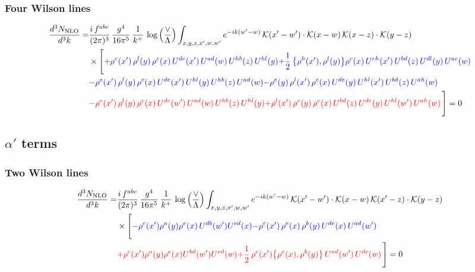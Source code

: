 \documentclass[9pt]{article}
\numberwithin{equation}{section}
\begin{document}
\subsubsection{Four Wilson lines}
\begin{align}
\frac{d^{3}N_{\rm NLO}}{d^{3}k} = &\frac{i\,f^{abc}}{(2\pi)^{3}}\,\frac{g^{4}}{16\pi^{5}}\,\frac{1}{k^{+}}\,\log\Big(\frac{\vee}{\Lambda}\Big)\int_{x,y,z,x',w,w'}e^{-ik(w'-w)}\,\mathcal{K}(x'-w')\cdot\mathcal{K}(x-w)\,\mathcal{K}(x-z)\cdot\mathcal{K}(y-z)\notag\\
&\times\Bigg[{\color{blue}+\rho^{e}(x')\, \rho^{l}(y)\,\rho^{c}(x)\, U^{de}(x')\,U^{ad}(w)\,U^{hb}(z)\,U^{hl}(y)}{\color{blue}+\frac{1}{2}\,\big\{\rho^{h}(x'),\rho^{l}(y)\big\}\rho^{c}(x)\,U^{eh}(x')\,U^{bd}(z)\,U^{dl}(y)\,U^{ae}(w)}\notag \\
&{\color{blue}-\rho^{e}(x')\,\rho^{l}(y)\,\rho^{c}(x)\,U^{de}(x')\,U^{hl}(y)\,U^{hb}(z)\,U^{ad}(w)}{\color{blue}-\rho^{e}(y)\,\rho^{l}(x')\,\rho^{c}(x)\,U^{de}(y)\,U^{hl}(x')\,U^{bd}(z)\,U^{ah}(w)} \notag \\ &{\color{red}-\rho^{e}(x')\, \rho^{l}(y)\,\rho^{c}(x)\, U^{de}(w')\,U^{ad}(w)\,U^{hb}(z)\,U^{hl}(y)}{\color{red}+\rho^{l}(x')\,\rho^{e}(y)\,\rho^{c}(x)\,U^{bd}(z)\,U^{de}(y)\,U^{hl}(w')\,U^{ah}(w)}\,\Bigg] = 0
\end{align}
\subsection{$\alpha'$ terms}
\subsubsection{Two Wilson lines}
\begin{align}
\frac{d^{3}N_{\rm NLO}}{d^{3}k}= & \frac{i\,f^{abc}}{(2\pi)^{3}}\,\frac{g^{4}}{16\pi^{5}}\,\frac{1}{k^{+}}\,\log\Big(\frac{\vee}{\Lambda}\Big)\int_{x,y,z,x',w,w'}e^{-ik(w'-w)}\,\mathcal{K}(x'-w')\cdot\mathcal{K}(x-w)\,\mathcal{K}(x'-z)\cdot\mathcal{K}(y-z)\notag \\ & \times\Bigg[ {\color{blue}-\rho^{c}(x') \rho^{a}(y) \rho^{e}(x)\,U^{d b}(w') U^{e d}(x)}{\color{blue}-\rho^{c}(x')\,\rho^{e}(x)\,\rho^{b}(y)\,U^{de}(x)\,U^{ad}(w')}\notag \\
&{\color{red}+\rho^{c}(x') \rho^{a}(y) \rho^{e}(x) U^{b d}(w') U^{e d}(w)}{\color{red}+\frac{1}{2}\,\rho^{c}(x')\big\{\rho^{e}(x),\rho^{b}(y)\big\}\,U^{ad}(w')\,U^{de}(w)}\,\Bigg] = 0
\end{align}
\end{document}
